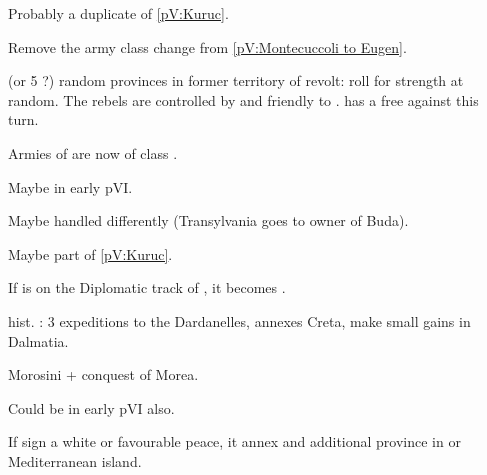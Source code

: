 
\begin{todo}
  Probably a duplicate of \ref{pV:Kuruc}.
  
  Remove the army class change from \ref{pV:Montecuccoli to Eugen}.
\end{todo}

\phevnt
{} (or 5 ?) random \HAB provinces in former territory of \paysHongrie
revolt: roll for strength at random.
\bparag The rebels are controlled by \TUR and friendly to \TUR.
\aparag \TUR has a free \CB against \HAB this turn.

\phadm
\aparag Armies of \AUSaus are now of class \CAIV.


\begin{todo}
  Maybe in early pVI.

  Maybe handled differently (Transylvania goes to owner of Buda).

  Maybe part of \ref{pV:Kuruc}.
\end{todo}

\phdipl If \paysTransylvanie is on the Diplomatic track of \TUR, it becomes
\Neutral. 


\begin{todo}
  hist. : 3 expeditions to the Dardanelles, \TUR annexes Creta, \VEN make
  small gains in Dalmatia.
\end{todo}


\begin{todo}
  Morosini + conquest of Morea.

  Could be in early pVI also.
\end{todo}

\phpaix If \paysVenise sign a white or favourable peace, it annex and
additional province in \regionBalkans or Mediterranean island.



